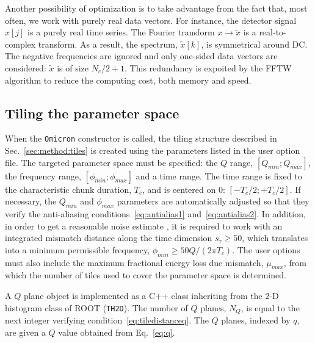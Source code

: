 Another possibility of optimization is to take advantage from the fact that, most often, we work with purely real data vectors. For instance, the detector signal $x[j]$ is a purely real time series. The Fourier transform $x\rightarrow\tilde{x}$ is a real-to-complex transform. As a result, the spectrum, $\tilde{x}[k]$, is symmetrical around DC. The negative frequencies are ignored and only one-sided data vectors are considered: $\tilde{x}$ is of size $N_c/2+1$. This redundancy is expoited by the FFTW algorithm to reduce the computing cost, both memory and speed.



\subsection{Tiling the parameter space} \label{sec:algorithm:tiling}

When the \texttt{Omicron} constructor is called, the tiling structure described in Sec.~\ref{sec:method:tiles} is created using the parameters listed in the user option file. The targeted parameter space must be specified: the $Q$ range, $[Q_{min}; Q_{max}]$, the frequency range, $[\phi_{min}; \phi_{max}]$ and a time range. The time range is fixed to the characteristic chunk duration, $T_c$, and is centered on 0: $[-T_c/2; +T_c/2]$. If necessary, the $Q_{min}$ and $\phi_{max}$ parameters are automatically adjusted so that they verify the anti-aliasing conditions~\ref{eq:antialias1} and~\ref{eq:antialias2}. In addition, in order to get a reasonable noise estimate , it is required to work with an integrated mismatch distance along the time dimension $s_\tau\ge50$, which translates into a minimum permissible frequency, $\phi_{min} \ge 50Q/(2\pi T_c)$.
The user options must also include the maximum fractional energy loss due mismatch, $\mu_{max}$, from which the number of tiles used to cover the parameter space is determined.

A $Q$ plane object is implemented as a C++ class inheriting from the 2-D histogram class of ROOT (\texttt{TH2D}). The number of $Q$ planes, $N_Q$, is equal to the next integer verifying condition~\ref{eq:tiledistanceq}. The $Q$ planes, indexed by $q$, are given a $Q$ value obtained from Eq.~\ref{eq:q}.

